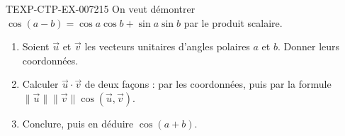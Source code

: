 \begin{exercice}{TEXP-CTP-EX-007}{2}{15}
On veut démontrer $\cos(a-b)=\cos a\cos b+\sin a\sin b$ par le produit
scalaire.
\begin{enumerate}
  \item Soient $\vec{u}$ et $\vec{v}$ les vecteurs unitaires d'angles polaires
        $a$ et $b$. Donner leurs coordonnées.
  \item Calculer $\vec{u}\cdot\vec{v}$ de deux façons : par les coordonnées,
        puis par la formule $\|\vec u\|\|\vec v\|\cos(\vec u,\vec v)$.
  \item Conclure, puis en déduire $\cos(a+b)$.
\end{enumerate}
\end{exercice}
